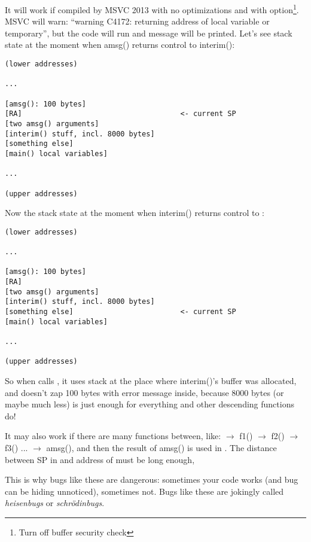 It will work if compiled by MSVC 2013 with no optimizations and with  option\footnote{Turn off buffer security check}.
MSVC will warn: ``warning C4172: returning address of local variable or temporary'', but the code will run and message
will be printed.
Let's see stack state at the moment when amsg() returns control to interim():

\begin{lstlisting}
(lower addresses)

...

[amsg(): 100 bytes]
[RA]                                     <- current SP
[two amsg() arguments]
[interim() stuff, incl. 8000 bytes]
[something else]
[main() local variables]

...

(upper addresses)
\end{lstlisting}

Now the stack state at the moment when interim() returns control to \main{}:

\begin{lstlisting}
(lower addresses)

...

[amsg(): 100 bytes]
[RA]
[two amsg() arguments]
[interim() stuff, incl. 8000 bytes]
[something else]                         <- current SP
[main() local variables]

...

(upper addresses)
\end{lstlisting}

So when \main calls \printf, it uses stack at the place where interim()'s buffer was allocated,
and doesn't zap 100 bytes with error message inside, because 8000 bytes (or maybe much less) is just enough for everything
\printf and other descending functions do!

It may also work if there are many functions between, like:
\main $\rightarrow$ f1() $\rightarrow$ f2() $\rightarrow$ f3() ... $\rightarrow$ amsg(),
and then the result of amsg() is used in \main.
The distance between \ac{SP} in \main and address of  must be long enough,

This is why bugs like these are dangerous: sometimes your code works (and bug can be hiding unnoticed), sometimes not.
\label{heisenbug}
Bugs like these are jokingly called \emph{heisenbugs} or \emph{schrödinbugs}.

